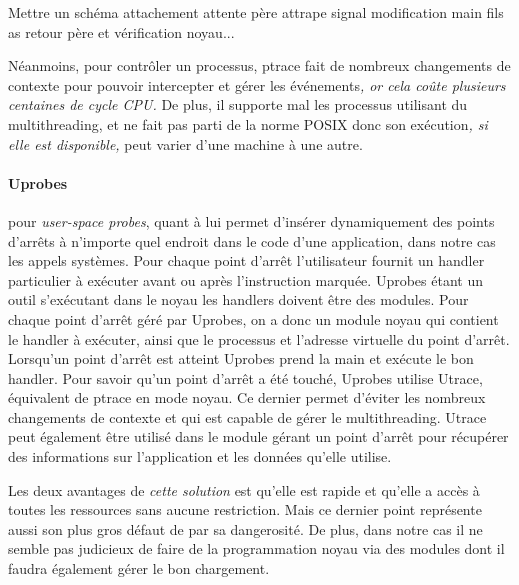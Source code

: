 {\color{red} Mettre un schéma attachement attente père attrape signal
  modification main fils as retour père et vérification noyau...}

Néanmoins, pour contrôler un processus, ptrace fait de nombreux changements de
contexte pour pouvoir intercepter et gérer les événements\textit{, or cela coûte
  plusieurs centaines de cycle CPU.} De plus, il supporte mal les processus
utilisant du multithreading, et ne fait pas parti de la norme POSIX donc son
exécution\textit{, si elle est disponible,} peut varier d'une machine à une
autre.

\paragraph{Uprobes}\cite{INTERCEPTION:AS, INTERCEPTION:MARION}
pour \textit{user-space probes}, quant à lui permet d'insérer dynamiquement des
points d'arrêts à n'importe quel endroit dans le code d'une application, dans
notre cas les appels systèmes. Pour chaque point d'arrêt l’utilisateur fournit
un handler particulier à exécuter avant ou après l’instruction marquée. Uprobes
étant un outil s'exécutant dans le noyau les handlers doivent être des
modules. Pour chaque point d'arrêt géré par Uprobes, on a donc un module noyau
qui contient le handler à exécuter, ainsi que le processus et l'adresse
virtuelle du point d'arrêt. Lorsqu'un point d'arrêt est atteint Uprobes prend la
main et exécute le bon handler. Pour savoir qu'un point d'arrêt a été touché,
Uprobes utilise Utrace, équivalent de ptrace en mode noyau. Ce dernier permet
d'éviter les nombreux changements de contexte et qui est capable de gérer le
multithreading. Utrace peut également être utilisé dans le module gérant un
point d'arrêt pour récupérer des informations sur l'application et les données
qu'elle utilise.

Les deux avantages de \textit{cette solution} est qu'elle est rapide et qu'elle a accès à
toutes les ressources sans aucune restriction. Mais ce dernier point représente
aussi son plus gros défaut de par sa dangerosité. De plus, dans notre cas il ne
semble pas judicieux de faire de la programmation noyau via des modules dont il
faudra également gérer le bon chargement.

